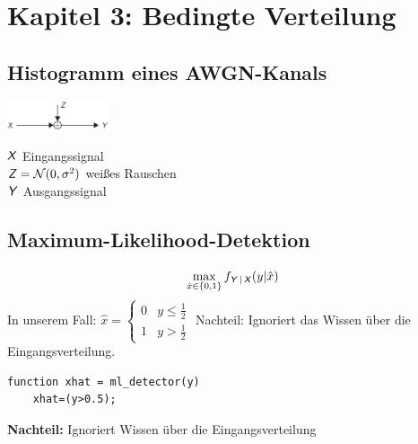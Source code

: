 \documentclass[deutsch]{latex4ei/latex4ei_sheet}
\begin{document}
\section{Kapitel 3: Bedingte Verteilung}
\begin{sectionbox}
	\subsection{Histogramm eines AWGN-Kanals}
	\parbox{3.3cm}{
	\includegraphics[width = 3cm]{img/awgn-channel.png}
	}
	\parbox{4cm}{
		$\operatorname{\textsf{\textit{X}}}$ Eingangssignal\\
		$\operatorname{\textsf{\textit{Z}}} = \mathcal N(0, \sigma^2)$ weißes Rauschen\\
		$\operatorname{\textsf{\textit{Y}}}$ Ausgangssignal
		}
	
\end{sectionbox}

\begin{sectionbox}
	\subsection{Maximum-Likelihood-Detektion}
	\[ \max_{\hat x \in \{0,1\}}f_{\operatorname{\textsf{\textit{Y}}}|\operatorname{\textsf{\textit{X}}}}(y|\hat x) \]
	In unserem Fall: $\hat x = \begin{cases}
	0 & y\le \frac{1}{2}\\
	1 & y > \frac{1}{2}
	\end{cases}$
	Nachteil: Ignoriert das Wissen über die Eingangsverteilung.\\
	\begin{lstlisting}[gobble=4]
	function xhat = ml_detector(y)
	xhat=(y>0.5);
	\end{lstlisting}
	\textbf{Nachteil:} Ignoriert Wissen über die Eingangsverteilung \\
\end{sectionbox}
\end{document}
